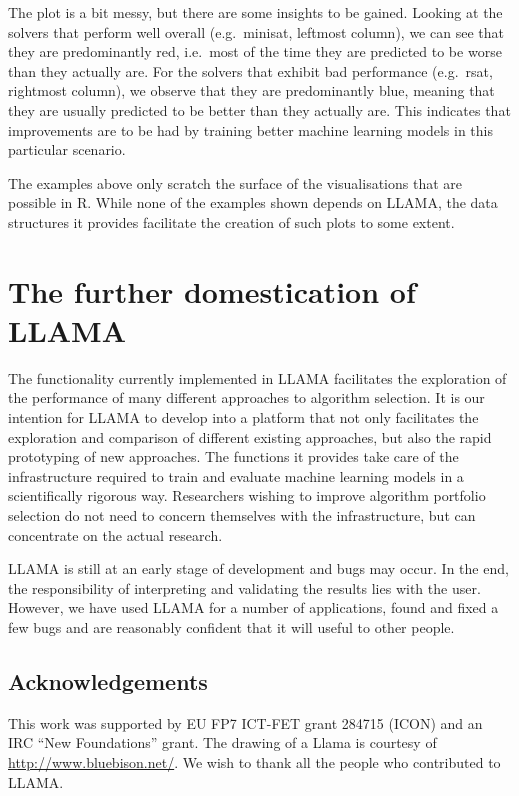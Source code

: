 \documentclass{article}\usepackage[]{graphicx}\usepackage[]{color}
\begin{document}
The plot is a bit messy, but there are some insights to be gained. Looking at
the solvers that perform well overall (e.g.\ minisat, leftmost column), we can
see that they are predominantly red, i.e.\ most of the time they are predicted
to be worse than they actually are. For the solvers that exhibit bad performance
(e.g.\ rsat, rightmost column), we observe that they are predominantly blue,
meaning that they are usually predicted to be better than they actually are.
This indicates that improvements are to be had by training better machine
learning models in this particular scenario.

\medskip

The examples above only scratch the surface of the visualisations that are
possible in R. While none of the examples shown depends on LLAMA, the data
structures it provides facilitate the creation of such plots to some extent.


\section{The further domestication of LLAMA}

The functionality currently implemented in LLAMA facilitates the exploration of
the performance of many different approaches to algorithm selection. It is our
intention for LLAMA to develop into a platform that not only facilitates the
exploration and comparison of different existing approaches, but also the rapid
prototyping of new approaches. The functions it provides take care of the
infrastructure required to train and evaluate machine learning models in a
scientifically rigorous way. Researchers wishing to improve algorithm portfolio
selection do not need to concern themselves with the infrastructure, but can
concentrate on the actual research.

LLAMA is still at an early stage of development and bugs may occur. In the end,
the responsibility of interpreting and validating the results lies with the
user. However, we have used LLAMA for a number of applications, found and fixed
a few bugs and are reasonably confident that it will useful to other people.


\subsection*{Acknowledgements}

This work was supported by EU FP7 ICT-FET grant 284715 (ICON) and an IRC ``New
Foundations'' grant. The drawing of a Llama is courtesy of
\url{http://www.bluebison.net/}. We wish to thank all the people who contributed
to LLAMA.



\end{document}
